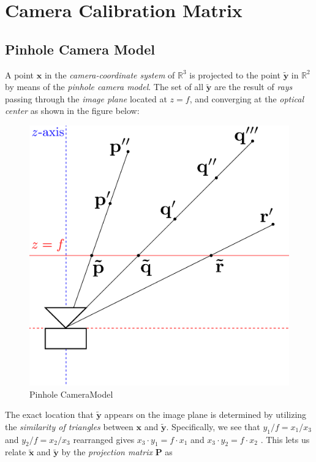 \section{Camera Calibration Matrix}

\subsection{Pinhole Camera Model}

\par A point $\mathbf{x}$ in the \textit{camera-coordinate system} of $\mathbb{R}^3$ is projected to the point $\mathbf{\tilde{y}}$ in $\mathbb{R}^{2}$ by means of the \textit{pinhole camera model}. The set of all $\mathbf{\tilde{y}}$ are the result of \textit{rays} passing through the \textit{image plane} located at $z=f$, and converging at the \textit{optical center} as shown in the figure below:
\begin{figure}[htbp]
	\centering
%	
	\includegraphics[scale=0.25]{Camera}
	\caption{Pinhole CameraModel}
\end{figure}\newline
The exact location that $\mathbf{\tilde{y}}$ appears on the image plane is determined by utilizing the \textit{similarity of triangles} between $\mathbf{x}$ and $\mathbf{\tilde{y}}$. 
Specifically, we see that $y_1/f=x_1/x_3$ and $y_2/f=x_2/x_3$ rearranged gives $x_3\cdot y_1=f\cdot x_1$ and $x_3\cdot y_2=f\cdot x_2$ . This lets us relate $\mathbf{\tilde{x}}$ and $\mathbf{\tilde{y}}$ by the \textit{projection matrix} $\mathbf{P}$ as

